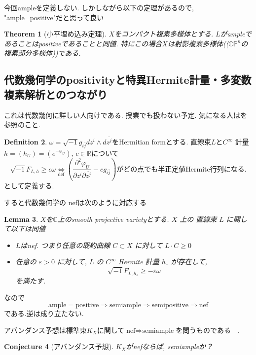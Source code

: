 \documentclass[dvipdfmx,a4paper,11pt]{article} %
\newtheorem{thm}{Theorem}[section]
\newtheorem{conj}[thm]{Conjecture}
\newtheorem{lem}[thm]{Lemma}
\theoremstyle{definition}
\newtheorem{defn}[thm]{Definition}
\theoremstyle{remark}
\numberwithin{equation}{section}
\newcommand{\R}{\mathbb{R}}
\newcommand{\C}{\mathbb{C}}
\begin{document}
今回ampleを定義しない. しかしながら以下の定理があるので, "ample=positive"だと思って良い
\begin{thm}[小平埋め込み定理]
$X$をコンパクト複素多様体とする. 
$L$がampleであることはpositiveであることと同値. 
特にこの場合$X$は射影複素多様体((\(\C\mathbb{P}^n\)の複素部分多様体))である. 
\end{thm}

\subsection{代数幾何学のpositivityと特異Hermite計量・多変数複素解析とのつながり}
これは代数幾何に詳しい人向けである. 授業でも扱わない予定. 
気になる人は\cite[Section 5]{Dem12}を参照のこと. 

 \begin{defn}
 $\omega=\sqrt{-1}g_{i \overline{j}}dz^i \wedge d\overline{z^j}$をHermitian formとする.
  直線束$L$と\(C^\infty\) 計量$h = (h_{U})=(e^{-\varphi_{U}})$, $c \in \R$について
 $$
 \sqrt{-1}F_{L,h} \ge c\omega
 \underset{\text{def}}{\Leftrightarrow}
\left( \frac{\partial^2 \varphi_U }{\partial z^i \partial \overline{z^j}}  - cg_{i \overline{j}}\right)
\text{がどの点でも半正定値Hermite行列になる.}
 $$
 として定義する. 
 \end{defn}

すると代数幾何学の nefは次のように対応する
\begin{lem}
$X$を$\C$上のsmooth projective varietyとする.  \(X\) 上の 直線束 \(L\) に関して以下は同値
\begin{itemize}
\item $L$はnef. つまり任意の既約曲線 \(C\subset X\) に対して
\(
L\cdot C\geq 0
\)
\item  任意の \(\varepsilon>0\) に対して, \(L\) の \(C^\infty\) Hermite 計量 \(h_\varepsilon\) が存在して,
\[
 \sqrt{-1}F_{L,h_\varepsilon}\geq -\varepsilon\omega
\]
を満たす. 
\end{itemize}
\end{lem}
なので
$$
\text{ample}=\text{positive} \Rightarrow
\text{semiample} \Rightarrow
\text{semipositive} \Rightarrow \text{nef} 
$$
である.逆は成り立たない. 

アバンダンス予想は標準束$K_X$に関して$\text{nef} \Rightarrow \text{semiample}  $を問うものである　.
\begin{conj}[アバンダンス予想]
$K_X$がnefならば, semiampleか？
\end{conj}
\end{document}
